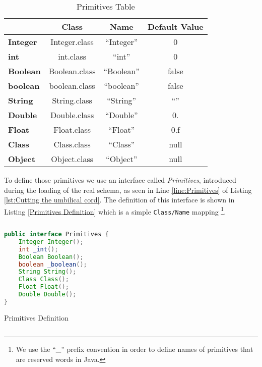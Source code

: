 \begin{table}[H]
	\centering
	\begin{tabular}{@{}lccc@{}}
	\toprule
	                 & \textbf{Class} & \textbf{Name} & \textbf{Default Value} \\ \midrule
	\textbf{Integer} & Integer.class  & ``Integer''   & 0                      \\
	\textbf{int}     & int.class      & ``int''       & 0                      \\
	\textbf{Boolean} & Boolean.class  & ``Boolean''   & false                  \\
	\textbf{boolean} & boolean.class  & ``boolean''   & false                  \\
	\textbf{String}  & String.class   & ``String''    & ``''                   \\
	\textbf{Double}  & Double.class   & ``Double''    & 0.                     \\
	\textbf{Float}   & Float.class    & ``Float''     & 0.f                    \\
	\textbf{Class}   & Class.class    & ``Class''     & null                   \\
	\textbf{Object}  & Object.class   & ``Object''    & null                   \\ \bottomrule
	\end{tabular}
	\caption{Primitives Table}
	\label{tbl:primivites_table}
\end{table}

To define those primitives we use an interface called \textit{Primitives}, introduced during the loading of the real schema, as seen in Line \ref{line:Primitives} of Listing \ref{lst:Cutting the umbilical cord}.
The definition of this interface is shown in Listing \ref{Primitives Definition} which is a simple \texttt{Class/Name} mapping \footnote{We use the ``\_'' prefix convention in order to define names of primitives that are reserved words in Java.}. 

\begin{sourcecode} [H]
	\begin{lstlisting}[language=Java, escapechar=|]
public interface Primitives {
	Integer Integer();
	int _int();
	Boolean Boolean();
	boolean _boolean();
	String String();
	Class Class();
	Float Float();
	Double Double();
}
	\end{lstlisting}
	\caption{Primitives Definition}
	\label{lst:Primitives Definition}
\end{sourcecode}

